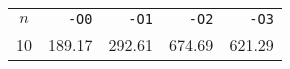 \begin{center}
  \bgroup{}
  \begin{tabular}{c|rrrr}
    \hline
    $n$ & \texttt{-O0} & \texttt{-O1} & \texttt{-O2} & \texttt{-O3} \\
    \hhline{=====}
    10 & 189.17 & 292.61 & 674.69 & 621.29 \\
    \hline
  \end{tabular}
  \egroup
\end{center}
